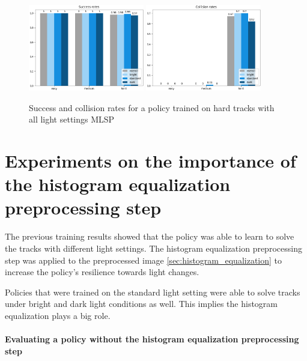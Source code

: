 \begin{figure}
    \centering
    \includegraphics[width=0.45\textwidth]{Bilder/notebook_images/hardDistanceMixedLight_eval_all_success_rates_barplot.png}
    \includegraphics[width=0.45\textwidth]{Bilder/notebook_images/hardDistanceMixedLight_eval_all_collision_rates_barplot.png}
    \caption{Success and collision rates for a policy trained on hard tracks with all light settings \ac{MLSP}}
    \label{fig:hardDistance_mixedLightTraining_results}
\end{figure}



\section{Experiments on the importance of the histogram equalization preprocessing step}
\label{sec:importance_histogram_equalization}

The previous training results showed that the policy was able to learn to solve the tracks with different light settings. The histogram equalization preprocessing step was applied to the preprocessed image \ref{sec:histogram_equalization} to increase the policy's resilience towards light changes.

Policies that were trained on the standard light setting were able to solve tracks under bright and dark light conditions as well. This implies the histogram equalization plays a big role.

\paragraph{Evaluating a policy without the histogram equalization preprocessing step}

